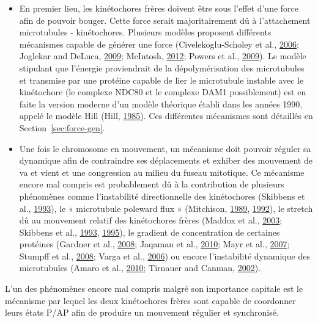\documentclass[12pt,a4paper,twoside,openright]{book}
\begin{document}
\begin{itemize}
\item
  En premier lieu, les kinétochores frères doivent être sous l'effet
  d'une force afin de pouvoir bouger. Cette force serait majoritairement
  dû à l'attachement microtubules - kinétochores. Plusieurs modèles
  proposent différents mécanismes capable de générer une force
  (Civelekoglu-Scholey et al.,
  \hyperref[ref-Civelekoglu-Scholey2006]{2006}; Joglekar and DeLuca,
  \hyperref[ref-Joglekar2009]{2009}; McIntosh,
  \hyperref[ref-McIntosh2012]{2012}; Powers et al.,
  \hyperref[ref-Powers2009a]{2009}). Le modèle stipulant que l'énergie
  proviendrait de la dépolymérisation des microtubules et transmise par
  une protéine capable de lier le microtubule instable avec le
  kinétochore (le complexe NDC80 et le complexe DAM1 possiblement) est
  en faite la version moderne d'un modèle théorique établi dans les
  années 1990, appelé le modèle Hill (Hill,
  \hyperref[ref-Hill1985]{1985}). Ces différentes mécanismes sont
  détaillés en Section~\ref{sec:force-gen}.
\item
  Une fois le chromosome en mouvement, un mécanisme doit pouvoir réguler
  sa dynamique afin de contraindre ses déplacements et exhiber des
  mouvement de va et vient et une congression au milieu du fuseau
  mitotique. Ce mécanisme encore mal compris est probablement dû à la
  contribution de plusieurs phénomènes comme l'instabilité
  directionnelle des kinétochores (Skibbens et al.,
  \hyperref[ref-Skibbens1993]{1993}), le « microtubule poleward flux »
  (Mitchison, \hyperref[ref-Mitchison1989]{1989},
  \hyperref[ref-Mitchison1992]{1992}), le stretch dû au mouvement
  relatif des kinétochores frères (Maddox et al.,
  \hyperref[ref-Maddox2003]{2003}; Skibbens et al.,
  \hyperref[ref-Skibbens1993]{1993}, \hyperref[ref-Skibbens1995]{1995}),
  le gradient de concentration de certaines protéines (Gardner et al.,
  \hyperref[ref-Gardner2008a]{2008}; Jaqaman et al.,
  \hyperref[ref-Jaqaman2010]{2010}; Mayr et al.,
  \hyperref[ref-Mayr2007]{2007}; Stumpff et al.,
  \hyperref[ref-Stumpff2008]{2008}; Varga et al.,
  \hyperref[ref-Varga2006]{2006}) ou encore l'instabilité dynamique des
  microtubules (Amaro et al., \hyperref[ref-Amaro2010a]{2010}; Tirnauer
  and Canman, \hyperref[ref-Tirnauer2002]{2002}).
\end{itemize}

L'un des phénomènes encore mal compris malgré son importance capitale
est le mécanisme par lequel les deux kinétochores frères sont capable de
coordonner leurs états P/AP afin de produire un mouvement régulier et
synchronisé.
\end{document}
